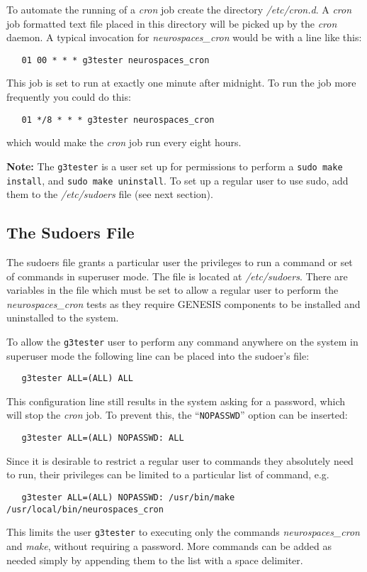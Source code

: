 \documentclass[12pt]{article}
\begin{document}
To automate the running of a {\it cron} job create the directory {\it /etc/cron.d}. A {\it cron} job formatted text file placed in this directory will be picked up by the {\it cron} daemon. A typical invocation for {\it neurospaces\_cron} would be with a line like this:
\begin{verbatim}
   01 00 * * * g3tester neurospaces_cron
\end{verbatim}
This job is set to run at exactly one minute after midnight. To run the job more frequently you could do this:
\begin{verbatim}
   01 */8 * * * g3tester neurospaces_cron
\end{verbatim}
which would make the {\it cron} job run every eight hours.

{\bf Note:} The {\tt g3tester} is a user set up for permissions to perform a {\tt sudo make install}, and {\tt sudo make uninstall}. To set up a regular user to use sudo, add them to the {\it /etc/sudoers} file (see next section).

\subsection*{The Sudoers File}

The sudoers file grants a particular user the privileges to run a command or set of commands in superuser mode. The file is located at {\it /etc/sudoers}. There are variables in the file which must be set to allow a regular user to perform the {\it neurospaces\_cron} tests as they require GENESIS components to be installed and uninstalled to the system.

To allow the {\tt g3tester} user to perform any command anywhere on the system in superuser mode the following line can be placed into the sudoer's file:
\begin{verbatim}
   g3tester ALL=(ALL) ALL
\end{verbatim}
This configuration line still results in the system asking for a password, which will stop the {\it cron} job. To prevent this, the ``{\tt NOPASSWD}'' option can be inserted:
\begin{verbatim}
   g3tester ALL=(ALL) NOPASSWD: ALL
\end{verbatim}
Since it is desirable to restrict a regular user to commands they absolutely need to run, their privileges can be limited to a particular list of command, e.g.
\begin{verbatim}
   g3tester ALL=(ALL) NOPASSWD: /usr/bin/make /usr/local/bin/neurospaces_cron
\end{verbatim}
This limits the user {\tt g3tester} to executing only the commands {\it neurospaces\_cron} and {\it make}, without requiring a password. More commands can be added as needed simply by appending them to the list with a space delimiter. 
\end{document}
